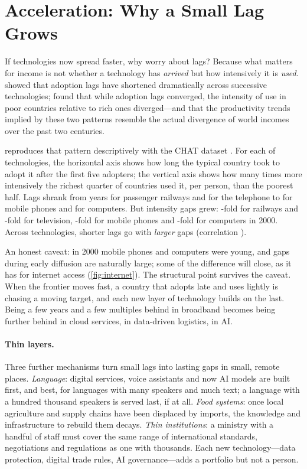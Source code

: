 \section{Acceleration: Why a Small Lag Grows}
\label{sec:accel}

If technologies now spread faster, why worry about lags? Because what
matters for income is not whether a technology has \emph{arrived} but how
intensively it is \emph{used}. \textcite{comin2010} showed that adoption lags
have shortened dramatically across successive technologies;
\textcite{comin2018} found that while adoption lags converged, the intensity of use in poor
countries relative to rich ones diverged---and that the productivity trends
implied by these two patterns resemble the actual divergence of world incomes
over the past two centuries.



 reproduces that pattern descriptively with the CHAT
dataset \parencite{comin2009chat}. For each of \nTechs{} technologies, the
horizontal axis shows how long the typical country took to adopt it after the
first five adopters; the vertical axis shows how many times more intensively
the richest quarter of countries used it, per person, than the poorest half.
Lags shrank from \lagRail{} years for passenger railways and
\lagTelephone{} for the telephone to \lagCell{} for mobile phones and
\lagComputer{} for computers. But intensity gaps grew: \gapRail-fold for
railways and \gapTV-fold for television, \gapCell-fold for mobile phones and
\gapComputer-fold for computers in 2000. Across technologies, shorter lags
go with \emph{larger} gaps (correlation \corrLagGap).

An honest caveat: in 2000 mobile phones and computers were young, and gaps
during early diffusion are naturally large; some of the difference will close,
as it has for internet access (\cref{fig:internet}). The structural point
survives the caveat. When the frontier moves fast, a country that adopts
late and uses lightly is chasing a moving target, and each new layer of
technology builds on the last. Being a few years and a few multiples behind
in broadband becomes being further behind in cloud services, in data-driven
logistics, in AI.

\paragraph{Thin layers.} Three further mechanisms turn small lags into
lasting gaps in small, remote places.
\emph{Language}: digital services, voice assistants and now AI models are
built first, and best, for languages with many speakers and much text; a
language with a hundred thousand speakers is served last, if at all.
\emph{Food systems}: once local agriculture and supply chains have been
displaced by imports, the knowledge and infrastructure to rebuild them
decays. \emph{Thin institutions}: a ministry with a handful of staff must
cover the same range of international standards, negotiations and
regulations as one with thousands. Each new technology---data protection,
digital trade rules, AI governance---adds a portfolio but not a person.
